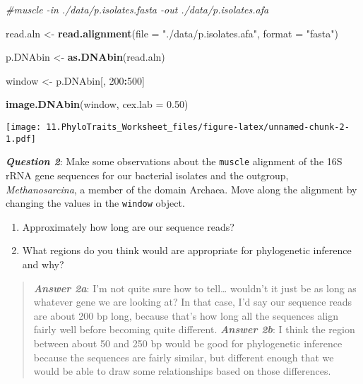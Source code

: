\documentclass[]{article}
\newenvironment{Shaded}{\begin{snugshade}}{\end{snugshade}}
\newcommand{\KeywordTok}[1]{\textcolor[rgb]{0.13,0.29,0.53}{\textbf{#1}}}
\newcommand{\DataTypeTok}[1]{\textcolor[rgb]{0.13,0.29,0.53}{#1}}
\newcommand{\DecValTok}[1]{\textcolor[rgb]{0.00,0.00,0.81}{#1}}
\newcommand{\FloatTok}[1]{\textcolor[rgb]{0.00,0.00,0.81}{#1}}
\newcommand{\StringTok}[1]{\textcolor[rgb]{0.31,0.60,0.02}{#1}}
\newcommand{\CommentTok}[1]{\textcolor[rgb]{0.56,0.35,0.01}{\textit{#1}}}
\newcommand{\OperatorTok}[1]{\textcolor[rgb]{0.81,0.36,0.00}{\textbf{#1}}}
\newcommand{\NormalTok}[1]{#1}
\providecommand{\tightlist}{%
  \setlength{\itemsep}{0pt}\setlength{\parskip}{0pt}}
\begin{document}
\begin{Shaded}
\begin{Highlighting}[]
\CommentTok{#muscle -in ./data/p.isolates.fasta -out ./data/p.isolates.afa}

\NormalTok{read.aln <-}\StringTok{ }\KeywordTok{read.alignment}\NormalTok{(}\DataTypeTok{file =} \StringTok{"./data/p.isolates.afa"}\NormalTok{, }\DataTypeTok{format =} \StringTok{"fasta"}\NormalTok{)}

\NormalTok{p.DNAbin <-}\StringTok{ }\KeywordTok{as.DNAbin}\NormalTok{(read.aln)}

\NormalTok{window <-}\StringTok{ }\NormalTok{p.DNAbin[, }\DecValTok{200}\OperatorTok{:}\DecValTok{500}\NormalTok{]}

\KeywordTok{image.DNAbin}\NormalTok{(window, }\DataTypeTok{cex.lab =} \FloatTok{0.50}\NormalTok{)}
\end{Highlighting}
\end{Shaded}

\texttt{[image: 11.PhyloTraits\_Worksheet\_files/figure-latex/unnamed-chunk-2-1.pdf]}

\textbf{\emph{Question 2}}: Make some observations about the
\texttt{muscle} alignment of the 16S rRNA gene sequences for our
bacterial isolates and the outgroup, \emph{Methanosarcina}, a member of
the domain Archaea. Move along the alignment by changing the values in
the \texttt{window} object.

\begin{enumerate}
\def\labelenumi{\alph{enumi}.}
\tightlist
\item
  Approximately how long are our sequence reads?\\
\item
  What regions do you think would are appropriate for phylogenetic
  inference and why?
\end{enumerate}

\begin{quote}
\textbf{\emph{Answer 2a}}: I'm not quite sure how to tell\ldots{}
wouldn't it just be as long as whatever gene we are looking at? In that
case, I'd say our sequence reads are about 200 bp long, because that's
how long all the sequences align fairly well before becoming quite
different. \textbf{\emph{Answer 2b}}: I think the region between about
50 and 250 bp would be good for phylogenetic inference because the
sequences are fairly similar, but different enough that we would be able
to draw some relationships based on those differences.
\end{quote}
\end{document}
